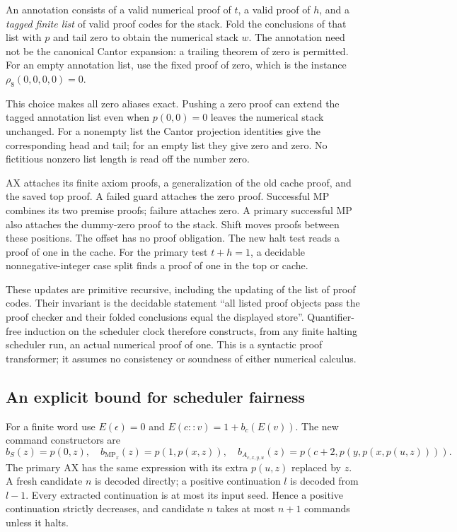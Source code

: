 An annotation consists of a valid numerical proof of $t$, a valid
proof of $h$, and a \emph{tagged finite list} of valid proof codes for
the stack.  Fold the conclusions of that list with $p$ and tail zero
to obtain the numerical stack $w$.  The annotation need not be the
canonical Cantor expansion: a trailing theorem of zero is permitted.
For an empty annotation list, use the fixed proof of zero, which is
the instance $\rho_8(0,0,0,0)=0$.

This choice makes all zero aliases exact.  Pushing a zero proof can
extend the tagged annotation list even when $p(0,0)=0$ leaves the
numerical stack unchanged.  For a nonempty list the Cantor projection
identities give the corresponding head and tail; for an empty list
they give zero and zero.  No fictitious nonzero list length is read
off the number zero.

AX attaches its finite axiom proofs, a generalization of the old
cache proof, and the saved top proof.  A failed guard attaches the
zero proof.  Successful MP combines its two premise proofs; failure
attaches zero.  A primary successful MP also attaches the dummy-zero
proof to the stack.  Shift moves proofs between these positions.
The offset has no proof obligation.  The new halt test reads a proof
of one in the cache.  For the primary test $t+h=1$, a decidable
nonnegative-integer case split finds a proof of one in the top or
cache.

These updates are primitive recursive, including the updating of
the list of proof codes.  Their invariant is the decidable statement
``all listed proof objects pass the proof checker and their folded
conclusions equal the displayed store''.  Quantifier-free induction
on the scheduler clock therefore constructs, from any finite halting
scheduler run, an actual numerical proof of one.  This is a syntactic
proof transformer; it assumes no consistency or soundness of either
numerical calculus.

\subsection{An explicit bound for scheduler fairness}

For a finite word use $E(\epsilon)=0$ and
$E(c::v)=1+b_c(E(v))$.  The new command constructors are
\[
 b_S(z)=p(0,z),\quad
 b_{\operatorname{MP}_x}(z)=p(1,p(x,z)),\quad
 b_{A_{c,x,y,u}}(z)=p(c+2,p(y,p(x,p(u,z)))).                \tag{9}
\]
The primary AX has the same expression with its extra $p(u,z)$
replaced by $z$.  A fresh candidate $n$ is decoded directly; a
positive continuation $l$ is decoded from $l-1$.  Every extracted
continuation is at most its input seed.  Hence a positive continuation
strictly decreases, and candidate $n$ takes at most $n+1$ commands
unless it halts.

